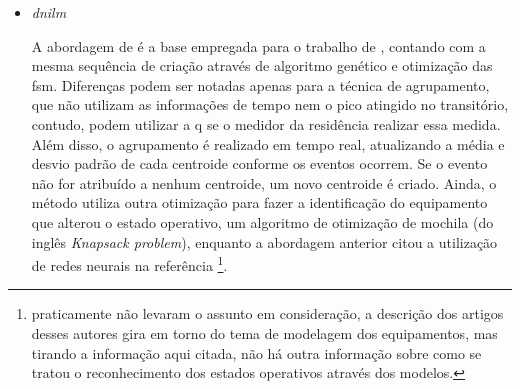 \begin{enumerate}[label=\textbf{1.\arabic*},wide=\parindent]
\begin{enumerate}[label*=.\textbf{\arabic*},wide=\parindent]
\begin{itemize}[wide=\parindent]
\begin{equation}\label{eq:shannon}
Q_{shannon} = - \Delta{e_{i}} \log{|\Delta{e_{i}}|}
\end{equation}

Os melhores caminhos operativos para as \glspl{fsm} ainda precisam ser
resolvidos quanto aos centroides que pertencem a mais de um equipamento.
Para isso, \cite{nilm_baranski_summary_2004_21} cita resumidamente um
algoritmo de força bruta que investigará para cada sobreposição
qual caminho tem a melhor qualidade.

Os autores revelam que o método necessita de 5 a 10 dias para
encontrar os modelos dos equipamentos típicos, enquanto dados diários
são suficientes para atualizar o catálogo de equipamentos detectados em
cada residência. Os resultados mostram que os equipamentos de maiores
consumo, como geladeira, aquecedor elétrico (de fluxo) e fogão podem
ser detectados com eficiência.

\item \emph{\gls{dnilm}}

A abordagem de \citeauthor*{nilm_baranski_summary_2004_21} é a base
empregada para o trabalho de \citet*{nilm_bergman_distribuido_2011},
contando com a mesma sequência de criação através de algoritmo
genético e otimização das \gls{fsm}. Diferenças podem ser notadas
apenas para a técnica de agrupamento, que não utilizam as informações
de tempo nem o pico atingido no transitório, contudo, podem utilizar a
\gls{q} se o medidor da residência realizar essa medida. Além disso, o
agrupamento é realizado em tempo real, atualizando a média e desvio
padrão de cada centroide conforme os eventos ocorrem. Se o evento não
for atribuído a nenhum centroide, um novo centroide é criado. Ainda, o
método utiliza outra otimização para fazer a identificação do equipamento
que alterou o estado operativo, um algoritmo de otimização de mochila
(do inglês \emph{Knapsack problem}), enquanto a abordagem anterior
citou a utilização de redes neurais na referência
\cite{nilm_baranski_genetic_base_2003_19}\footnote{
\citeauthor*{nilm_baranski_genetic_base_2003_19}
praticamente não levaram o assunto em consideração, a descrição dos
artigos desses autores gira em torno do tema de modelagem dos
equipamentos, mas tirando a informação aqui citada, não há outra
informação sobre como se tratou o reconhecimento dos estados
operativos através dos modelos.}.


\end{itemize}
\end{enumerate}
\end{enumerate}
